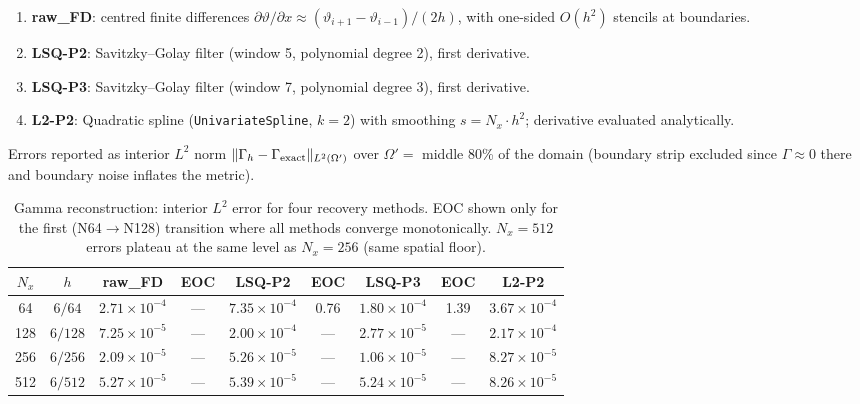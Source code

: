 \documentclass[11pt,a4paper]{article}
\begin{document}
\begin{enumerate}
  \item \textbf{raw\_FD}: centred finite differences
    $\partial\vartheta/\partial x \approx (\vartheta_{i+1}-\vartheta_{i-1})/(2h)$,
    with one-sided $O(h^2)$ stencils at boundaries.

  \item \textbf{LSQ-P2}: Savitzky--Golay filter (window 5, polynomial degree 2),
    first derivative.

  \item \textbf{LSQ-P3}: Savitzky--Golay filter (window 7, polynomial degree 3),
    first derivative.

  \item \textbf{L2-P2}: Quadratic spline (\texttt{UnivariateSpline}, $k=2$)
    with smoothing $s = N_x \cdot h^2$; derivative evaluated analytically.
\end{enumerate}

Errors reported as interior $L^2$ norm $\|\Gamma_h - \Gamma_{\rm exact}\|_{L^2(\Omega')}$
over $\Omega' = $ middle 80\% of the domain (boundary strip excluded
since $\Gamma\approx 0$ there and boundary noise inflates the metric).

\begin{table}[htb]
  \centering
  \caption{Gamma reconstruction: interior $L^2$ error for four recovery
    methods.  EOC shown only for the first (N64$\to$N128) transition where
    all methods converge monotonically.  $N_x=512$ errors plateau at the
    same level as $N_x=256$ (same spatial floor).}
  \label{tab:gamma}
  \begin{tabular}{ccccccccc}
    \toprule
    $N_x$ & $h$
      & raw\_FD & EOC
      & LSQ-P2 & EOC
      & LSQ-P3 & EOC
      & L2-P2 \\
    \midrule
    64  & $6/64$
      & $2.71\times10^{-4}$ & ---
      & $7.35\times10^{-4}$ & 0.76
      & $1.80\times10^{-4}$ & 1.39
      & $3.67\times10^{-4}$ \\
    128 & $6/128$
      & $7.25\times10^{-5}$ & ---
      & $2.00\times10^{-4}$ & ---
      & $2.77\times10^{-5}$ & ---
      & $2.17\times10^{-4}$ \\
    256 & $6/256$
      & $2.09\times10^{-5}$ & ---
      & $5.26\times10^{-5}$ & ---
      & $1.06\times10^{-5}$ & ---
      & $8.27\times10^{-5}$ \\
    512 & $6/512$
      & $5.27\times10^{-5}$ & ---
      & $5.39\times10^{-5}$ & ---
      & $5.24\times10^{-5}$ & ---
      & $8.26\times10^{-5}$ \\
    \bottomrule
  \end{tabular}
\end{table}
\end{document}
